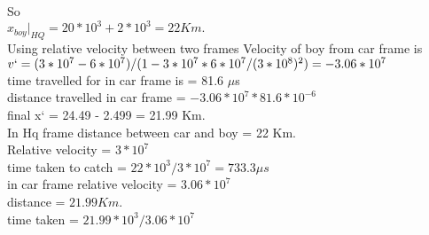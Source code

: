 \documentclass[10pt, a4paper]{article}
\begin{document}
\begin{enumerate}
{So\\
\begin{math} x_{boy}|_{HQ} = 20*10^3 + 2*10^3 = 22 Km. \end{math}\\
Using relative velocity between two frames Velocity of boy from car frame is\\
\begin{math} v` = (3*10^7 - 6*10^7) / (1 - 3*10^7*6*10^7 / (3*10^8)^2) = -3.06*10^7 \end{math}\\
time travelled for in car frame is = 81.6 \begin{math} \mu \end{math}s\\
distance travelled in car frame = \begin{math} -3.06*10^7 * 81.6 * 10^{-6} \end{math}\\
final x` = 24.49 - 2.499 = 21.99 Km.\\
In Hq frame distance between car and boy = 22 Km.\\
Relative velocity = \begin{math} 3*10^7 \end{math}\\
time taken to catch = \begin{math} 22*10^3 / 3*10^7 = 733.3 \mu s \end{math}\\
in car frame relative velocity = \begin{math} 3.06*10^7 \end{math}\\
distance = \begin{math} 21.99 Km. \end{math}\\
time taken = \begin{math} 21.99 * 10^3 / 3.06*10^7 \end{math}\\
}
\end{enumerate}
\end{document}
